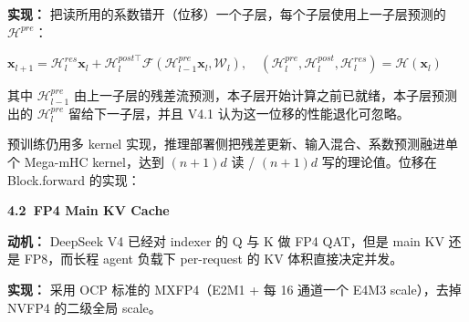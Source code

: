 \documentclass[zihao=false,fontset=windows]{ctexart}
\newcommand{\incode}[1]{\colorbox{inlinebg}{\ttfamily\small #1}}
\newcommand{\bigmath}[1]{%
  \begin{center}\large$\displaystyle #1$\end{center}%
}
\begin{document}
\textcolor{feishuRed}{\textbf{实现：}} 把读所用的系数错开（位移）一个子层，每个子层使用上一子层预测的 $\mathcal{H}^{pre}$：\par

\bigmath{\mathbf{x}_{l+1}=\mathcal{H}_l^{res}\mathbf{x}_l+\mathcal{H}_l^{post\top}\mathcal{F}(\mathcal{H}_{l-1}^{pre}\mathbf{x}_l,\mathcal{W}_l),\quad(\mathcal{H}_l^{pre},\mathcal{H}_l^{post},\mathcal{H}_l^{res})=\mathcal{H}(\mathbf{x}_l)}

其中 $\mathcal{H}_{l-1}^{pre}$ 由上一子层的残差流预测，本子层开始计算之前已就绪，本子层预测出的 $\mathcal{H}_{l}^{pre}$ 留给下一子层，并且 V4.1 认为这一位移的性能退化可忽略。\par

预训练仍用多 kernel 实现，推理部署侧把残差更新、输入混合、系数预测融进单个 Mega-mHC kernel，达到 $(n+1)d$ 读 / $(n+1)d$ 写的理论值。位移在 \incode{Block.forward} 的实现：\par



\par{}\vspace{0.8em}\noindent \begin{tcolorbox}[boxrule=0pt,arc=3pt,colback=callOrange,left=3pt,right=3pt,top=2pt,bottom=2pt,before skip=0pt,after skip=0pt]{\bfseries \textcolor{feishuBlue}{4.2}\ FP4 Main KV Cache}\end{tcolorbox}\par\vspace{0.28em}

\textcolor{feishuRed}{\textbf{动机：}} DeepSeek V4 已经对 indexer 的 Q 与 K 做 FP4 QAT，但是 main KV 还是 FP8，而长程 agent 负载下 per-request 的 KV 体积直接决定并发。\par

\textcolor{feishuRed}{\textbf{实现：}} 采用 OCP 标准的 MXFP4（E2M1 + 每 16 通道一个 E4M3 scale），去掉 NVFP4 的二级全局 scale。\par
\end{document}
